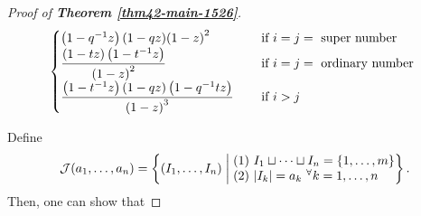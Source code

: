 \documentclass[12pt,reqno,a4paper]{amsart}
\newcommand{\cals}[1]{\mathcal{#1}}
\numberwithin{equation}{section}
\theoremstyle{definition}
\begin{document}
\begin{proof}[Proof of \textbf{Theorem \ref{thm42-main-1526}}]
\begin{align}
\begin{cases}
{			\left(1 - q^{-1}			z			\right)
			\left(1 - q			z	\right)
		}{
			\left(1 - z\right)^2
		}
		\hspace{0.3cm}
		&\text{ if } i = j = \text{ super number }
		\\
		\displaystyle 
		\frac{
			\left(1 - tz\right)
			\left(1 - t^{-1}z\right)
		}{
			\left(1 - z\right)^2
		}
		\hspace{0.3cm}
		&\text{ if } i = j = \text{ ordinary number }
		\\
		\displaystyle
		\frac{
			\left(1 - t^{-1}z\right)
			\left(1 - q		z		\right)
			\left(1 - q^{-1}t		z	\right)
		}{
			\left(1 - z\right)^3
		}
		\hspace{0.3cm}
		&\text{ if } i > j 
	\end{cases}
\end{align}

Define
\begin{align}
	\cals{J}(a_1,\dots,a_n) = 
	\left\{
	(I_1,\dots,I_n)
	\;\middle\vert\;
	\begin{array}{@{}l@{}}
		(1) \,\, I_1 \sqcup \cdots \sqcup I_n = 
		\{1,\dots,m\}
		\\
		(2) \,\, |I_k| = a_k \,\, ^\forall k = 1,\dots,n
	\end{array}
	\right\}. 
\end{align}
Then, one can show that 
\vspace{0.2cm}


\end{proof}
\end{document}
